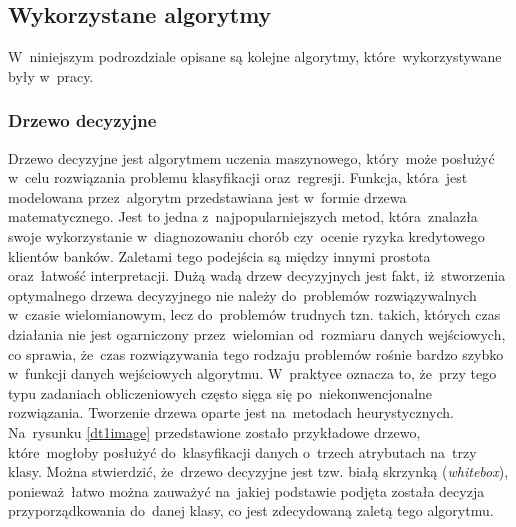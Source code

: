 \subsection{Wykorzystane algorytmy}
W~niniejszym podrozdziale opisane są kolejne algorytmy, które~wykorzystywane były w~pracy.
\subsubsection{Drzewo decyzyjne}
Drzewo decyzyjne jest algorytmem uczenia maszynowego, który~może posłużyć w~celu rozwiązania problemu klasyfikacji oraz~regresji. Funkcja, która~jest modelowana przez~algorytm przedstawiana jest w~formie drzewa matematycznego. Jest to jedna z~najpopularniejszych metod, która~znalazła swoje wykorzystanie w~diagnozowaniu chorób czy~ocenie ryzyka kredytowego klientów banków\cite{mitchel}. Zaletami tego podejścia są między innymi  prostota oraz~łatwość interpretacji. Dużą wadą drzew decyzyjnych jest fakt, iż~stworzenia optymalnego drzewa decyzyjnego nie należy do~problemów rozwiązywalnych w~czasie wielomianowym, lecz do~problemów trudnych tzn. takich, których czas działania nie jest ogarniczony przez~wielomian od~rozmiaru danych wejściowych, co sprawia, że~czas rozwiązywania tego rodzaju problemów rośnie bardzo szybko w~funkcji danych wejściowych algorytmu. W~praktyce oznacza to, że~przy tego typu zadaniach obliczeniowych często sięga się po~niekonwencjonalne rozwiązania. Tworzenie drzewa oparte jest na~metodach heurystycznych\cite{dtscikit}. Na~rysunku \ref{dt1image} przedstawione zostało przykładowe drzewo, które~mogłoby posłużyć do~klasyfikacji danych o~trzech atrybutach na~trzy klasy. Można stwierdzić, że~drzewo decyzyjne jest tzw. białą skrzynką (\textit{whitebox}), ponieważ~łatwo można zauważyć na~jakiej podstawie podjęta została decyzja przyporządkowania do~danej klasy, co jest zdecydowaną zaletą tego algorytmu.

